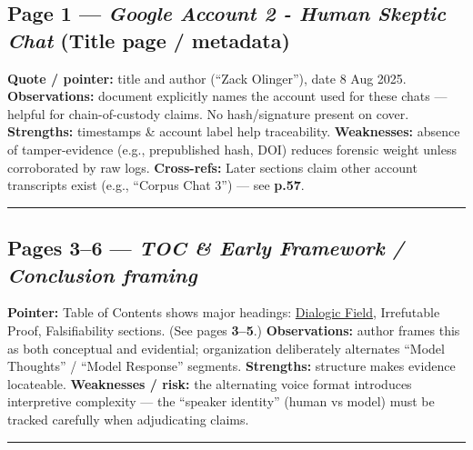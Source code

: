 \documentclass{article}
\begin{document}
\subsection*{\texorpdfstring{Page 1 --- \emph{Google Account 2 - Human Skeptic Chat} (Title page / metadata)}{Page 1 --- Google Account 2 - Human Skeptic Chat (Title page / metadata)}}\label{page-1-google-account-2---human-skeptic-chat-title-page-metadata}

\textbf{Quote / pointer:} title and author (``Zack Olinger''), date 8 Aug 2025. \textbf{Observations:} document explicitly names the account used for these chats --- helpful for chain-of-custody claims. No hash/signature present on cover. \textbf{Strengths:} timestamps \& account label help traceability. \textbf{Weaknesses:} absence of tamper-evidence (e.g., prepublished hash, DOI) reduces forensic weight unless corroborated by raw logs. \textbf{Cross-refs:} Later sections claim other account transcripts exist (e.g., ``Corpus Chat 3'') --- see \textbf{p.57}.

\begin{center}\rule{0.5\linewidth}{0.5pt}\end{center}

\subsection*{\texorpdfstring{Pages 3--6 --- \emph{TOC \& Early Framework / Conclusion framing}}{Pages 3--6 --- TOC \& Early Framework / Conclusion framing}}\label{pages-36-toc-early-framework-conclusion-framing}

\textbf{Pointer:} Table of Contents shows major headings: \hyperlink{gloss:dialogic_field}{Dialogic Field}, Irrefutable Proof, Falsifiability sections. (See pages \textbf{3--5}.) \textbf{Observations:} author frames this as both conceptual and evidential; organization deliberately alternates ``Model Thoughts'' / ``Model Response'' segments. \textbf{Strengths:} structure makes evidence locateable. \textbf{Weaknesses / risk:} the alternating voice format introduces interpretive complexity --- the ``speaker identity'' (human vs model) must be tracked carefully when adjudicating claims.

\begin{center}\rule{0.5\linewidth}{0.5pt}\end{center}
\end{document}
